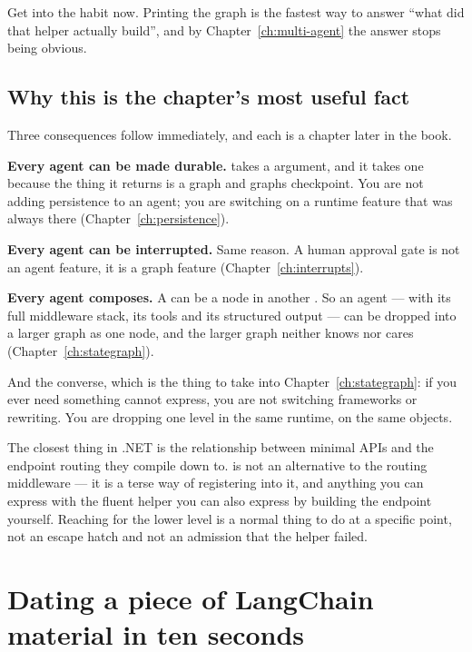 Get into the habit now. Printing the graph is the fastest way to answer ``what
did that helper actually build'', and by Chapter~\ref{ch:multi-agent} the answer
stops being obvious.

\subsection{Why this is the chapter's most useful fact}
\label{sec:inversion-consequences}

Three consequences follow immediately, and each is a chapter later in the book.

\textbf{Every agent can be made durable.}  takes a
 argument, and it takes one because the thing it returns is a
graph and graphs checkpoint. You are not adding persistence to an agent; you are
switching on a runtime feature that was always there
(Chapter~\ref{ch:persistence}).

\textbf{Every agent can be interrupted.} Same reason. A human approval gate is
not an agent feature, it is a graph feature (Chapter~\ref{ch:interrupts}).

\textbf{Every agent composes.} A  can be a node in
another . So an agent --- with its full middleware stack, its
tools and its structured output --- can be dropped into a larger graph as one
node, and the larger graph neither knows nor cares (Chapter~\ref{ch:stategraph}).

And the converse, which is the thing to take into Chapter~\ref{ch:stategraph}:
if you ever need something  cannot express, you are not
switching frameworks or rewriting. You are dropping one level in the same
runtime, on the same objects.

\begin{dotnetbox}
The closest thing in .NET is the relationship between minimal APIs and the
endpoint routing they compile down to.  is not an
alternative to the routing middleware --- it is a terse way of registering into
it, and anything you can express with the fluent helper you can also express by
building the endpoint yourself. Reaching for the lower level is a normal thing to
do at a specific point, not an escape hatch and not an admission that the helper
failed.
\end{dotnetbox}

\section{Dating a piece of LangChain material in ten seconds}
\label{sec:dating}

